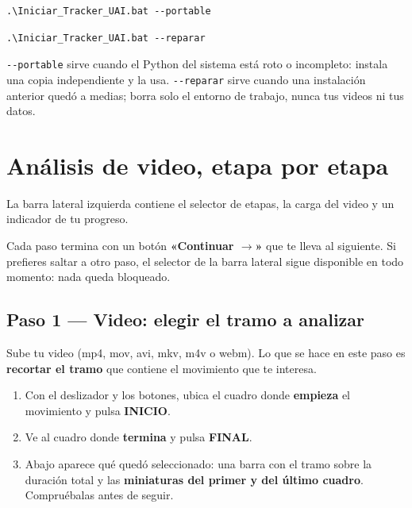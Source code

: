 \documentclass[11pt,a4paper]{article}
\begin{document}
\begin{lstlisting}[caption={Forzar la copia portable de Python.}]
.\Iniciar_Tracker_UAI.bat --portable
\end{lstlisting}

\begin{lstlisting}[caption={Borrar el entorno y rehacerlo desde cero.}]
.\Iniciar_Tracker_UAI.bat --reparar
\end{lstlisting}

\begin{obs}
  \texttt{-{}-portable} sirve cuando el Python del sistema está roto o
  incompleto: instala una copia independiente y la usa. \texttt{-{}-reparar}
  sirve cuando una instalación anterior quedó a medias; borra solo el entorno
  de trabajo, nunca tus videos ni tus datos.
\end{obs}

\section{Análisis de video, etapa por etapa}

La barra lateral izquierda contiene el selector de etapas, la carga del video y
un indicador de tu progreso.

\begin{obs}
  Cada paso termina con un botón \textbf{«Continuar $\rightarrow$»} que te lleva
  al siguiente. Si prefieres saltar a otro paso, el selector de la barra lateral
  sigue disponible en todo momento: nada queda bloqueado.
\end{obs}

\subsection{Paso 1 — Video: elegir el tramo a analizar}

Sube tu video (mp4, mov, avi, mkv, m4v o webm). Lo que se hace en este paso es
\textbf{recortar el tramo} que contiene el movimiento que te interesa.

\begin{receta}
  \begin{enumerate}
    \item Con el deslizador y los botones, ubica el cuadro donde \textbf{empieza}
      el movimiento y pulsa \textbf{INICIO}.
    \item Ve al cuadro donde \textbf{termina} y pulsa \textbf{FINAL}.
    \item Abajo aparece qué quedó seleccionado: una barra con el tramo sobre la
      duración total y las \textbf{miniaturas del primer y del último cuadro}.
      Compruébalas antes de seguir.
  \end{enumerate}
\end{receta}
\end{document}
